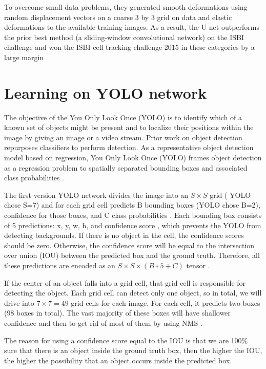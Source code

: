To overcome small data problems, they generated smooth deformations using random displacement vectors on a coarse 3 by 3 grid on data and elastic deformations to the available training images\cite{unet}. As a result, the U-net outperforms the prior best method (a sliding-window convolutional network) on the ISBI challenge and  won the ISBI cell tracking challenge 2015 in these categories by a large margin \cite{unet}


\section{Learning on YOLO network}

The objective of the You Only Look Once (YOLO)\cite{yolov1} is to identify which of a known set of objects might be present and to localize their positions within the image by giving an image or a video stream. Prior work on object detection repurposes classifiers to perform detection. As a representative object detection model based on regression, You Only Look Once (YOLO) frames object detection as a regression problem to spatially separated bounding boxes and associated class probabilities \cite{yolov1}.

The first version YOLO network divides the image into an $S \times S$ grid ( YOLO chose S=7) and for each grid cell predicts B bounding boxes (YOLO chose B=2), confidence for those boxes, and C class probabilities \cite{yolov1}. Each bounding box consists of 5 predictions: x, y, w, h, and confidence score \cite{yolov1}, which prevents the YOLO from detecting backgrounds.  If there is no object in the cell, the conﬁdence scores should be zero.  Otherwise, the conﬁdence score will be equal to the intersection over union (IOU) between the predicted box and the ground truth. Therefore,  all these predictions are encoded as an $S × S × (B ∗ 5 + C)$ tensor \cite{yolov1}.

If the center of an object falls into a grid cell, that grid cell is responsible for detecting the object. Each grid cell can detect only one object, so in total, we will drive into $7\times 7=49$ grid cells for each image. For each cell, it predicts two boxes (98 boxes in total). The vast majority of these boxes will have shallower confidence and then to get rid of most of them by using NMS \cite{yolov1}.

The reason for using a confidence score equal to the IOU is that we are 100\% sure that there is an object inside the ground truth box, then the higher the IOU, the higher the possibility that an object occurs inside the predicted box.



